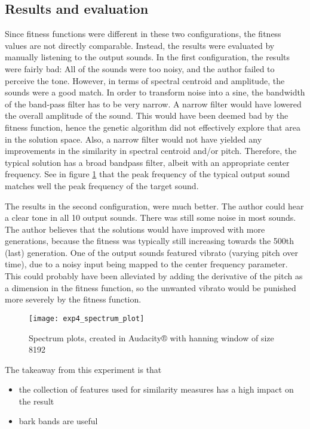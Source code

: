 \subsection{Results and evaluation}
Since fitness functions were different in these two configurations, the fitness values are not directly comparable. Instead, the results were evaluated by manually listening to the output sounds. In the first configuration, the results were fairly bad: All of the sounds were too noisy, and the author failed to perceive the tone. However, in terms of spectral centroid and amplitude, the sounds were a good match. In order to transform noise into a sine, the bandwidth of the band-pass filter has to be very narrow. A narrow filter would have lowered the overall amplitude of the sound. This would have been deemed bad by the fitness function, hence the genetic algorithm did not effectively explore that area in the solution space. Also, a narrow filter would not have yielded any improvements in the similarity in spectral centroid and/or pitch. Therefore, the typical solution has a broad bandpass filter, albeit with an appropriate center frequency. See in figure \ref{fig:exp4_spectrum_plot} that the peak frequency of the typical output sound matches well the peak frequency of the target sound.

The results in the second configuration, were much better. The author could hear a clear tone in all 10 output sounds. There was still some noise in most sounds. The author believes that the solutions would have improved with more generations, because the fitness was typically still increasing towards the 500th (last) generation. One of the output sounds featured vibrato (varying pitch over time), due to a noisy input being mapped to the center frequency parameter. This could probably have been alleviated by adding the derivative of the pitch as a dimension in the fitness function, so the unwanted vibrato would be punished more severely by the fitness function.

\begin{figure}[h]
    \centering
    \texttt{[image: exp4\_spectrum\_plot]}
    \caption{Spectrum plots, created in Audacity® with hanning window of size 8192}
    \label{fig:exp4_spectrum_plot}
\end{figure}

The takeaway from this experiment is that
\begin{itemize}  
\item the collection of features used for similarity measures has a high impact on the result
\item bark bands are useful
\end{itemize}

